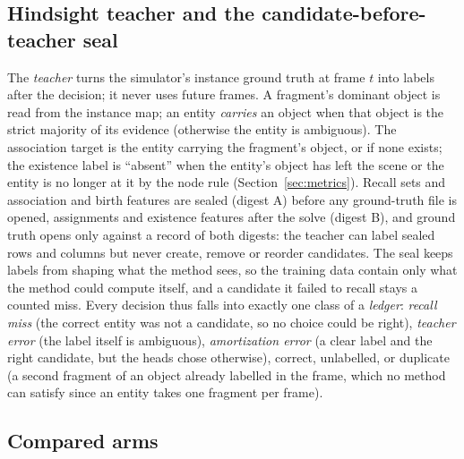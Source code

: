 \subsection{Hindsight teacher and the candidate-before-teacher seal}
\label{sec:teacher}
The \emph{teacher} turns the simulator's instance ground truth at frame $t$ into labels after the decision; it never uses future frames.
A fragment's dominant object is read from the instance map; an entity \emph{carries} an object when that object is the strict majority of its evidence (otherwise the entity is ambiguous).
The association target is the entity carrying the fragment's object, or  if none exists; the existence label is ``absent'' when the entity's object has left the scene or the entity is no longer at it by the node rule (Section~\ref{sec:metrics}).
Recall sets and association and birth features are sealed (digest A) before any ground-truth file is opened, assignments and existence features after the solve (digest B), and ground truth opens only against a record of both digests: the teacher can label sealed rows and columns but never create, remove or reorder candidates.
The seal keeps labels from shaping what the method sees, so the training data contain only what the method could compute itself, and a candidate it failed to recall stays a counted miss.
Every decision thus falls into exactly one class of a \emph{ledger}: \emph{recall miss} (the correct entity was not a candidate, so no choice could be right), \emph{teacher error} (the label itself is ambiguous), \emph{amortization error} (a clear label and the right candidate, but the heads chose otherwise), correct, unlabelled, or duplicate (a second fragment of an object already labelled in the frame, which no method can satisfy since an entity takes one fragment per frame).
\subsection{Compared arms}
\label{sec:arms}

